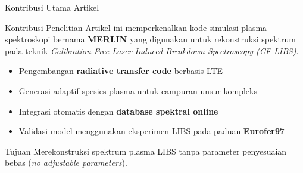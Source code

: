 \documentclass[aspectratio=169, 10pt]{beamer}
\begin{document}
\begin{frame}{Kontribusi Utama Artikel}
  \begin{block}{Kontribusi Penelitian}
    Artikel ini memperkenalkan kode simulasi plasma spektroskopi
    bernama \textbf{MERLIN} yang digunakan untuk rekonstruksi spektrum
    pada teknik \textit{Calibration-Free Laser-Induced Breakdown
    Spectroscopy (CF-LIBS)}.
  \end{block}

  \begin{itemize}
    \item Pengembangan \textbf{radiative transfer code} berbasis LTE
    \item Generasi adaptif spesies plasma untuk campuran unsur kompleks
    \item Integrasi otomatis dengan \textbf{database spektral online}
    \item Validasi model menggunakan eksperimen LIBS pada
          paduan \textbf{Eurofer97}
  \end{itemize}

  \vspace{6pt}
  \begin{alertblock}{Tujuan}
    Merekonstruksi spektrum plasma LIBS tanpa parameter penyesuaian
    bebas (\textit{no adjustable parameters}).
  \end{alertblock}
\end{frame}
\end{document}
